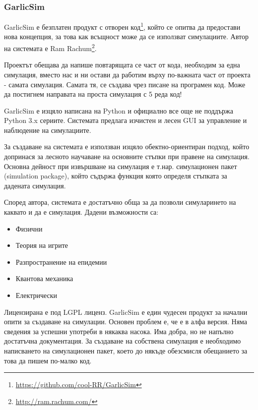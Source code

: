 		\subsubsection{GarlicSim}			
			
			GarlicSim е безплатен продукт с отворен код\footnote{\url{https://github.com/cool-RR/GarlicSim}}, 
			който се опитва да предостави нова концепция, за това как всъщност може да се използват симулациите.
			Автор на системата е Ram Rachum\footnote{\url{http://ram.rachum.com/}}.			
			
			
				Проектът обещава да напише повтарящата се част от кода, необходим за една симулация, вместо нас и ни
				остави да работим върху по-важната част от проекта - самата симулация. Самата тя, се създава чрез 
				писане на програмен код. Може да постигнем направата на проста симулация с 5 реда код!   			
			
				
				GarlicSim е изцяло написана на Python и официално все още не поддържа Python 3.x сериите. 
				Системата предлага изчистен и лесен GUI за управление и наблюдение на симулациите. 			
			
			
				За създаване на системата е използван изцяло обектно-ориентиран подход, който допринася за лесното
				научаване на основните стъпки при правене на симулация. Основна дейност при извършване на симулация
				е т.нар. симулационен пакет (simulation package), който съдържа функция която определя стъпката за
				дадената симулация.
			
			
				Според автора, системата е достатъчно обща за да позволи симуларинето на каквато и да е симулация.
				Дадени възможности са:

				\begin{itemize}
					\item Физични
					\item Теория на игрите
					\item Разпространение на епидемии
					\item Квантова механика
					\item Електрически
				\end{itemize}								
				
				Лицензирана е под \ac{LGPL} лиценз. GarlicSim е един чудесен продукт за начални опити за създаване на симулации. 
				Основен проблем е, че е в алфа версия. Няма сведения за успешни употреби в някаква насока.
				Има добра, но не напълно достатъчна документация. За създаване на собствена симулация е необходимо
				написването на симулационен пакет, което до някъде обезсмисля обещанието за това да пишем по-малко код.
				\cite{GarlicSim}